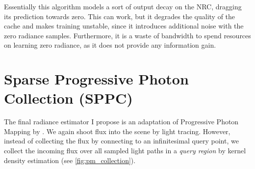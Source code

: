Essentially this algorithm models a sort of output decay on the NRC, dragging its prediction towards zero.
This can work, but it degrades the quality of the cache and makes training unstable, since it introduces additional noise with the zero radiance samples.
Furthermore, it is a waste of bandwidth to spend resources on learning zero radiance, as it does not provide any information gain.

\section{Sparse Progressive Photon Collection (SPPC)}
\label{sec:sppc}
The final radiance estimator I propose is an adaptation of Progressive Photon Mapping by \textcite{jensen1996,hachisuka2008}.
We again shoot flux into the scene by light tracing.
However, instead of collecting the flux by connecting to an infinitesimal query point, we collect the incoming flux over all sampled light paths in a \emph{query region} by kernel density estimation (see \cref{fig:pm_collection}).

